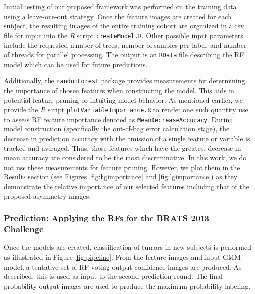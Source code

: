 \documentclass[preprint,authoryear,review,12pt]{elsarticle}
\begin{document}
Initial testing of our proposed framework was performed 
on the training data using a leave-one-out strategy.  Once the
feature images are created for each subject, the resulting images of the entire
training cohort are organized in a csv file for input into the \textit{R} script
{\tt createModel.R}.  Other possible input parameters include the requested 
number of trees, number of samples per label, and number of threads for parallel
processing.  The output is an {\tt RData} file describing the RF
model which can be used for future predictions.
 
Additionally, the {\tt randomForest} package provides  measurements 
for determining the importance of chosen features when constructing the model.  
This aids in potential feature pruning or intuiting model behavior.  As mentioned
earlier, we provide the \textit{R} script {\tt plotVariableImportance.R} to render
one such quantity use to assess RF feature importance denoted as {\tt MeanDecreaseAccuracy}.  
During model construction
(specifically the out-of-bag error calculation stage), the decrease in prediction accuracy
with the omission of a single feature or variable is tracked and averaged.  Thus,
those features which have the greatest decrease in mean accuracy are considered
to be the most discriminative.
In this work, we do not use these measurements for feature pruning.  However,
we plot them in the Results section (see Figures \ref{fig:hgimportance} and
\ref{fig:lgimportance}) as they demonstrate the relative importance of our
selected features including that of the proposed asymmetry images.

\subsubsection{Prediction:  Applying the RFs for the BRATS 2013 Challenge}

Once the models are created, classification of tumors in new subjects is performed
as illustrated in Figure \ref{fig:pipeline}.  From the feature images and input 
GMM model, a tentative set of RF voting output confidence images are produced.
As described, this is used as input to the second prediction round.  The 
final probability output images are used to produce the maximum probability labeling.  
\end{document}
